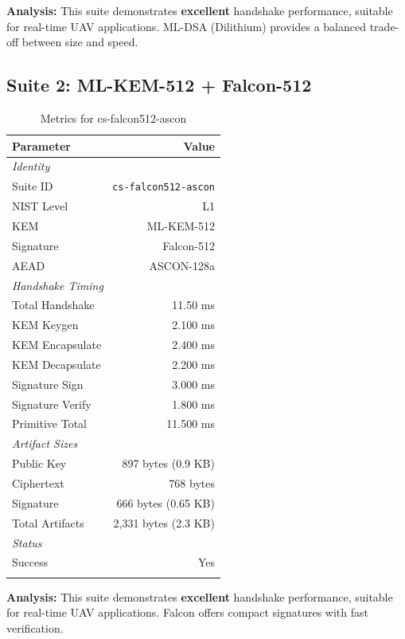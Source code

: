 \documentclass[11pt,a4paper,twoside]{article}
\begin{document}
\textbf{Analysis:} This suite demonstrates \textbf{excellent} handshake performance, suitable for real-time UAV applications. ML-DSA (Dilithium) provides a balanced trade-off between size and speed. 
\newpage
\subsection{Suite 2: ML-KEM-512 + Falcon-512}
\label{suite:cs-falcon512-ascon}

\begin{table}[H]
\centering
\caption{Metrics for cs-falcon512-ascon}
\begin{tabular}{l r}
\toprule
\textbf{Parameter} & \textbf{Value} \\
\midrule
\multicolumn{2}{l}{\textit{Identity}} \\
Suite ID & \texttt{cs-falcon512-ascon} \\
NIST Level & L1 \\
KEM & ML-KEM-512 \\
Signature & Falcon-512 \\
AEAD & ASCON-128a \\
\midrule
\multicolumn{2}{l}{\textit{Handshake Timing}} \\
Total Handshake & 11.50 ms \\
KEM Keygen & 2.100 ms \\
KEM Encapsulate & 2.400 ms \\
KEM Decapsulate & 2.200 ms \\
Signature Sign & 3.000 ms \\
Signature Verify & 1.800 ms \\
Primitive Total & 11.500 ms \\
\midrule
\multicolumn{2}{l}{\textit{Artifact Sizes}} \\
Public Key & 897 bytes (0.9 KB) \\
Ciphertext & 768 bytes \\
Signature & 666 bytes (0.65 KB) \\
Total Artifacts & 2,331 bytes (2.3 KB) \\
\midrule
\multicolumn{2}{l}{\textit{Status}} \\
Success & Yes \\
 \\
\bottomrule
\end{tabular}
\end{table}

\textbf{Analysis:} This suite demonstrates \textbf{excellent} handshake performance, suitable for real-time UAV applications. Falcon offers compact signatures with fast verification. 
\newpage
\end{document}
